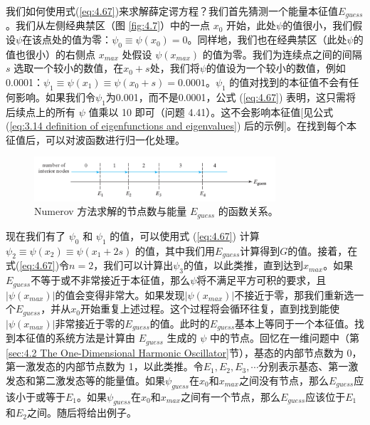     我们如何使用式(\ref{eq:4.67})来求解薛定谔方程？我们首先猜测一个能量本征值$E_{guess}$。我们从左侧经典禁区（图 \ref{fig:4.7}）中的一点 $x_0$ 开始，此处$\psi$的值很小，我们假设$\psi$在该点处的值为零：$\psi_0 \equiv \psi\left(x_0\right) = 0$。同样地，我们也在经典禁区（此处$\psi$的值也很小）的右侧点 $x_{max}$ 处假设 $\psi\left(x_{max}\right)$ 的值为零。我们为连续点之间的间隔 $s$ 选取一个较小的数值，在$x_0+s$处，我们将$\psi$的值设为一个较小的数值，例如0.0001：$\psi_1 \equiv \psi\left(x_1\right) \equiv \psi\left(x_0+s\right) = 0.0001$。$\psi_1$ 的值对找到的本征值不会有任何影响。如果我们令$\psi_1$为0.001，而不是0.0001，公式 (\ref{eq:4.67}) 表明，这只需将后续点上的所有 $\psi$ 值乘以 10 即可（问题 4.41）。这不会影响本征值[见公式 (\ref{eq:3.14 definition of eigenfunctions and eigenvalues}) 后的示例]。在找到每个本征值后，可以对波函数进行归一化处理。
    \begin{figure}[ht]
        \centering
        \includegraphics[width=0.8\textwidth]{Figures/4.8.png}
        \caption{Numerov 方法求解的节点数与能量 $E_{guess}$ 的函数关系。}
        \label{fig:4.8}
    \end{figure}

    现在我们有了 $\psi_0$ 和 $\psi_1$ 的值，可以使用式 (\ref{eq:4.67}) 计算 $\psi_2 \equiv \psi\left(x_2\right) \equiv \psi\left(x_1+2s\right)$ 的值，其中我们用$E_{guess}$计算得到$G$的值。接着，在式(\ref{eq:4.67})令$n=2$，我们可以计算出$\psi_3$的值，以此类推，直到达到$x_{max}$。如果$E_{guess}$不等于或不非常接近于本征值，那么$\psi$将不满足平方可积的要求，且$\left|\psi\left(x_{max}\right)\right|$的值会变得非常大。如果发现$\left|\psi\left(x_{max}\right)\right|$不接近于零，那我们重新选一个$E_{guess}$，并从$x_0$开始重复上述过程。这个过程将会循环往复，直到找到能使$\left|\psi\left(x_{max}\right)\right|$非常接近于零的$E_{guess}$的值。此时的$E_{guess}$基本上等同于一个本征值。找到本征值的系统方法是计算由 $E_{guess}$ 生成的 $\psi$ 中的节点。回忆在一维问题中（第\ref{sec:4.2 The One-Dimensional Harmonic Oscillator}节），基态的内部节点数为 0，第一激发态的内部节点数为 1，以此类推。令$E_1,E_2,E_3,\cdots$分别表示基态、第一激发态和第二激发态等的能量值。如果$\psi_{guess}$在$x_0$和$x_{max}$之间没有节点，那么$E_{guess}$应该小于或等于$E_1$。如果$\psi_{guess}$在$x_0$和$x_{max}$之间有一个节点，那么$E_{guess}$应该位于$E_1$和$E_2$之间。随后将给出例子。

